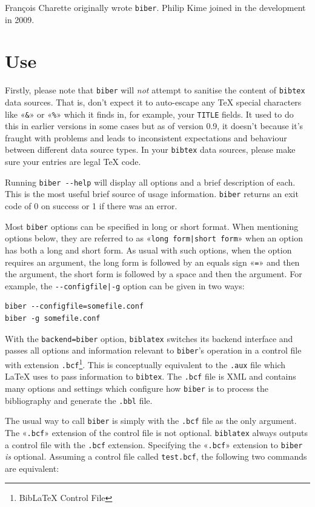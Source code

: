 \documentclass{ltxdockit}
\begin{document}
François Charette originally wrote \verb+biber+. Philip Kime joined in
the development in 2009.

\section{Use}

Firstly, please note that \verb+biber+ will \emph{not} attempt to sanitise
the content of \verb+bibtex+ data sources. That is, don't expect it to
auto-escape any TeX special characters like «\verb+&+» or «\verb+%+» which
it finds in, for example, your \verb+TITLE+ fields. It used to do this in
earlier versions in some cases but as of version 0.9, it doesn't because
it's fraught with problems and leads to inconsistent expectations and
behaviour between different data source types. In your \verb+bibtex+ data
sources, please make sure your entries are legal TeX code.

Running \verb+biber --help+ will display all options and a brief
description of each. This is the most useful brief source of usage
information. \verb+biber+ returns an exit code of 0 on success or 1 if
there was an error.

Most \verb+biber+ options can be specified in long or short format. When
mentioning options below, they are referred to as
«\verb+long form|short form+» when an option has both a long and short
form. As usual with such options, when the option requires an argument, the
long form is followed by an equals sign «\verb+=+» and then the argument,
the short form is followed by a space and then the argument. For example,
the \verb+--configfile|-g+ option can be given in two ways:

\begin{verbatim}
biber --configfile=somefile.conf
biber -g somefile.conf
\end{verbatim}

With the \verb+backend=biber+ option, \verb+biblatex+ switches its backend
interface and passes all options and information relevant to \verb+biber+'s
operation in a control file with extension \verb+.bcf+\footnote{BibLaTeX Control
  File}. This is conceptually equivalent to the \verb+.aux+ file which
LaTeX uses to pass information to \verb+bibtex+. The \verb+.bcf+ file is
XML and contains many options and settings which configure how \verb+biber+
is to process the bibliography and generate the \verb+.bbl+ file.

The usual way to call \verb+biber+ is simply with the \verb+.bcf+ file
as the only argument. The «\verb+.bcf+» extension of the control file
is not optional. \verb+biblatex+ always outputs a control file with
the \verb+.bcf+ extension. Specifying the «\verb+.bcf+» extension to
\verb+biber+ \emph{is} optional. Assuming a control file called
\verb+test.bcf+, the following two commands are equivalent:
\end{document}

